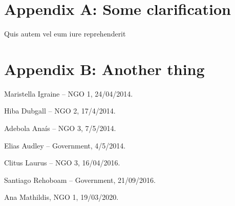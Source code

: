 \documentclass[
    a4paper,%
    DIV=calc,%
    abstract=true%
  ]{scrartcl}%
\newenvironment{app}{\newpage}{}
\begin{document}
  \begin{app}

  \label{app}
  \section{Appendix A: Some
  clarification}\label{appendix-a-some-clarification}

  Quis autem vel eum iure reprehenderit

  \section{Appendix B: Another thing}\label{appendix-b-another-thing}

  Maristella Igraine -- NGO 1, 24/04/2014.

  Hiba Dubgall -- NGO 2, 17/4/2014.

  Adebola Anaís -- NGO 3, 7/5/2014.

  Elias Audley -- Government, 4/5/2014.

  Clitus Laurus -- NGO 3, 16/04/2016.

  Santiago Rehoboam -- Government, 21/09/2016.

  Ana Mathildis, NGO 1, 19/03/2020.

  \end{app}

    
  
  
    
\end{document}
